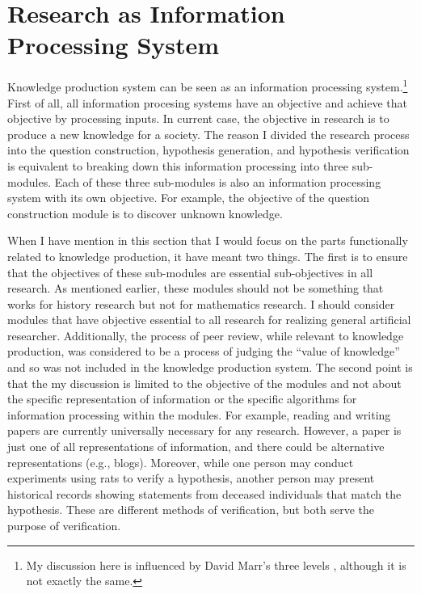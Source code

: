 \documentclass{article}
\begin{document}
\section{Research as Information Processing System}
Knowledge production system can be seen as an information processing system.\footnote{My discussion here is influenced by David Marr's three levels  \cite{marr2010vision}, although it is not exactly the same.} First of all, all information procesing systems have an objective and achieve that objective by processing inputs. In current case, the objective in research is to produce a new knowledge for a society. The reason I divided the research process into the question construction, hypothesis generation, and hypothesis verification is equivalent to breaking down this information processing into three sub-modules. Each of these three sub-modules is also an information processing system with its own objective. For example, the objective of the question construction module is to discover unknown knowledge.

When I have mention in this section that I would focus on the parts functionally related to knowledge production, it have meant two things. The first is to ensure that the objectives of these sub-modules are essential sub-objectives in all research. As mentioned earlier, these modules should not be something that works for history research but not for mathematics research. I should consider modules that have objective essential to all research for realizing general artificial researcher. Additionally, the process of peer review, while relevant to knowledge production, was considered to be a process of judging the ``value of knowledge'' and so was not included in the knowledge production system. The second point is that the my discussion is limited to the objective of the modules and not about the specific representation of information or the specific algorithms for information processing within the modules. For example, reading and writing papers are currently universally necessary for any research. However, a paper is just one of all representations of information, and there could be alternative representations (e.g., blogs). Moreover, while one person may conduct experiments using rats to verify a hypothesis, another person may present historical records showing statements from deceased individuals that match the hypothesis. These are different methods of verification, but both serve the purpose of verification.

\end{document}

